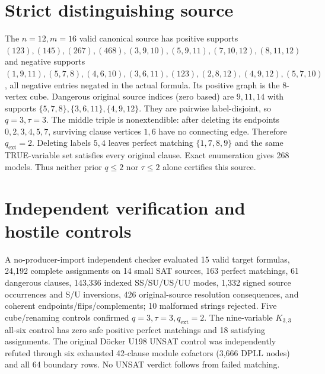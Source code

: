 \documentclass[11pt]{article}
\begin{document}
\section{Strict distinguishing source}
The $n=12,m=16$ valid canonical source has positive supports
$(123),(145),(267),(468),(3,9,10),(5,9,11),(7,10,12),(8,11,12)$
and negative supports
$(1,9,11),(5,7,8),(4,6,10),(3,6,11),(123),(2,8,12),(4,9,12),(5,7,10)$,
all negative entries negated in the actual formula. Its positive graph is the 8-vertex cube. Dangerous original source indices (zero based) are $9,11,14$ with supports $\{5,7,8\},\{3,6,11\},\{4,9,12\}$. They are pairwise label-disjoint, so $q=3,\tau=3$. The middle triple is nonextendible: after deleting its endpoints $0,2,3,4,5,7$, surviving clause vertices $1,6$ have no connecting edge. Therefore $q_{\mathrm{ext}}=2$. Deleting labels $5,4$ leaves perfect matching $\{1,7,8,9\}$ and the same TRUE-variable set satisfies every original clause. Exact enumeration gives 268 models. Thus neither prior $q\le2$ nor $\tau\le2$ alone certifies this source.
\section{Independent verification and hostile controls}
A no-producer-import independent checker evaluated 15 valid target formulas, 24,192 complete assignments on 14 small SAT sources, 163 perfect matchings, 61 dangerous clauses, 143,336 indexed SS/SU/US/UU modes, 1,332 signed source occurrences and S/U inversions, 426 original-source resolution consequences, and coherent endpoints/flips/complements; 10 malformed strings rejected. Five cube/renaming controls confirmed $q=3,\tau=3,q_{\mathrm{ext}}=2$. The nine-variable $K_{3,3}$ all-six control has zero safe positive perfect matchings and 18 satisfying assignments. The original D\"ocker U198 UNSAT control was independently refuted through six exhausted 42-clause module cofactors (3,666 DPLL nodes) and all 64 boundary rows. No UNSAT verdict follows from failed matching.
\end{document}
